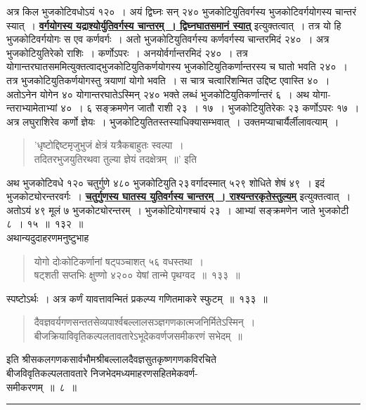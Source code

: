 \documentclass[11pt, openany]{book}
\begin{document}
अत्र किल भुजकोटिवधोऽयं १२०~। अयं द्विघ्नः सन् २४० भुजकोटियुतिवर्गस्य भुजकोटिवर्गयोगस्य चान्तरं स्यात्~। \hyperref[131]{\textbf{वर्गयोगस्य यद्राश्योर्युतिवर्गस्य चान्तरम्~। द्विघ्नघातसमानं स्यात्}} इत्युक्तत्वात्~। तत्र यो हि भुजकोटिवर्गयोगः स एव कर्णवर्गः~। अतो भुजकोटियुतिवर्गस्य कर्णवर्गस्य चान्तरमिदं २४०~। अत्र भुजकोटियुतिरेको राशिः~। कर्णोऽपरः~। अनयोर्वर्गान्तरमिदं २४०~। तत्र
योगान्तरघातसममित्युक्तत्वाद्भुजकोटियुतिकर्णयोगस्य
भुजकोटियुतिकर्णान्तरस्य च 
घातो भवति २४०~। तत्र भुजकोटियुतिकर्णयोगस्तु त्रयाणां योगो भवति~। स 
चात्र चत्वारिंशन्मित उद्दिष्ट एवास्ति ४०~। अतोऽनेन योगेन ४० योगान्तरघातेऽस्मिन् २४० भक्ते लब्धं भुजकोटियुतिकर्णान्तरं ६~। अथ
योगा-न्तराभ्यामेताभ्यां ४०~। ६ सङ्क्रमणेन जातौ राशी २३~। १७~। भुजकोटियुतिरेकः २३ कर्णोऽपरः १७~। 
अत्र लघुराशिरेव कर्णो ज्ञेयः~। भुजकोटियुतितस्तस्याधिक्यासम्भवात्~। 
उक्तमप्याचार्यैर्लीलावत्याम्~। 
\begin{quote}

    {\qt 'धृष्टोद्दिष्टमृजुभुजं क्षेत्रं यत्रैकबाहुतः स्वल्पा~। \\
 तदितरभुजयुतिरथवा तुल्या ज्ञेयं तदक्षेत्रम्~॥'} इति

\end{quote}
 \newpage
 अथ भुजकोटिवधे १२० चतुर्गुणे ४८० भुजकोटियुति\textendash \,२३\textendash \,वर्गादस्मात् ५२९ 
शोधिते शेषं ४९~। इदं भुजकोट्योरन्तरवर्गः~। \hyperref[131]{\textbf{चतुर्गुणस्य घातस्य युतिवर्गस्य चान्तरम्~। राश्यन्तरकृतेस्तुल्यम्}} इत्युक्तत्वात्~। अतोऽयं ४९ मूलं ७
भुजकोट्योरन्तरम्~। भुजकोटियोगश्चायं २३~। आभ्यां सङ्क्रमणेन जाते भुजकोटी 
८~। १५~॥~१३२~॥\\

\vspace{-2mm}
 अथान्यदुदाहरणमनुष्टुभाह\textendash
\begin{quote}
    \eg 
    योगो दोःकोटिकर्णानां षट्पञ्चाशत् ५६ वधस्तथा~। \\
 षट्शती सप्तभिः क्षुण्णो ४२०० येषां तान्मे पृथग्वद~॥~१३३~॥
\end{quote}
  
 स्पष्टोऽर्थः~। अत्र कर्णं यावत्तावन्मितं प्रकल्प्य गणितमाकरे स्फुटम्~॥~१३३~॥

\begin{quote}
{\qt दैवज्ञवर्यगणसन्ततसेव्यपार्श्वबल्लालसञ्ज्ञगणकात्मजनिर्मितेऽस्मिन्~। \\
बीजक्रियाविवृतिकल्पलतावतारेऽभूदेकवर्णजसमीकरणं सभेदम्~॥~}
\end{quote}

\begin{center}
     इति श्रीसकलगणकसार्वभौमश्रीबल्लालदैवज्ञसुतकृष्णगणकविरचिते \\
 बीजविवृतिकल्पलतावतारे निजभेदमध्यमाहरणसहितमेकवर्ण- \\
 समीकरणम्~॥~८~॥~\\
\rule{0.2\textwidth}{0.5pt}
\end{center}
\end{document}
